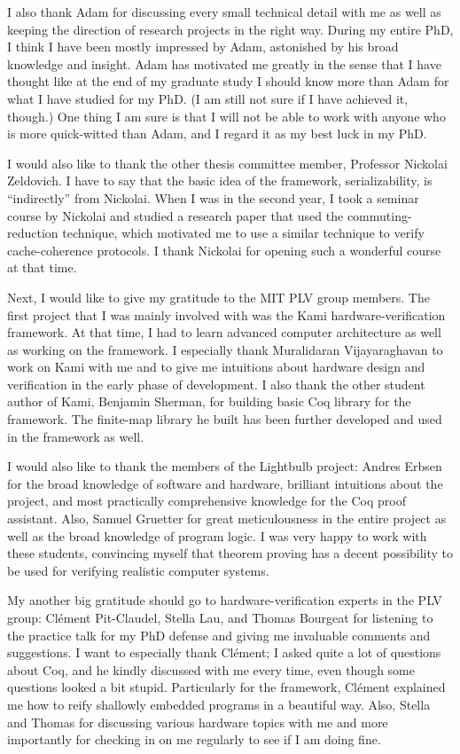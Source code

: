 I also thank Adam for discussing every small technical detail with me as well as keeping the direction of research projects in the right way.
During my entire PhD, I think I have been mostly impressed by Adam, astonished by his broad knowledge and insight.
Adam has motivated me greatly in the sense that I have thought like at the end of my graduate study I should know more than Adam for what I have studied for my PhD.
(I am still not sure if I have achieved it, though.)
One thing I am sure is that I will not be able to work with anyone who is more quick-witted than Adam, and I regard it as my best luck in my PhD.

I would also like to thank the other thesis committee member, Professor Nickolai Zeldovich.
I have to say that the basic idea of the \hemiola{} framework, serializability, is ``indirectly'' from Nickolai.
When I was in the second year, I took a seminar course by Nickolai and studied a research paper that used the commuting-reduction technique, which motivated me to use a similar technique to verify cache-coherence protocols.
I thank Nickolai for opening such a wonderful course at that time.

Next, I would like to give my gratitude to the MIT PLV group members.
The first project that I was mainly involved with was the Kami hardware-verification framework.
At that time, I had to learn advanced computer architecture as well as working on the framework.
I especially thank Muralidaran Vijayaraghavan to work on Kami with me and to give me intuitions about hardware design and verification in the early phase of development.
I also thank the other student author of Kami, Benjamin Sherman, for building basic Coq library for the framework.
The finite-map library he built has been further developed and used in the \hemiola{} framework as well.

I would also like to thank the members of the Lightbulb project: Andres Erbsen for the broad knowledge of software and hardware, brilliant intuitions about the project, and most practically comprehensive knowledge for the Coq proof assistant.
Also, Samuel Gruetter for great meticulousness in the entire project as well as the broad knowledge of program logic.
I was very happy to work with these students, convincing myself that theorem proving has a decent possibility to be used for verifying realistic computer systems.

My another big gratitude should go to hardware-verification experts in the PLV group: Cl\'ement Pit-Claudel, Stella Lau, and Thomas Bourgeat for listening to the practice talk for my PhD defense and giving me invaluable comments and suggestions.
I want to especially thank Cl\'ement; I asked quite a lot of questions about Coq, and he kindly discussed with me every time, even though some questions looked a bit stupid.
Particularly for the \hemiola{} framework, Cl\'ement explained me how to reify shallowly embedded programs in a beautiful way.
Also, Stella and Thomas for discussing various hardware topics with me and more importantly for checking in on me regularly to see if I am doing fine.

